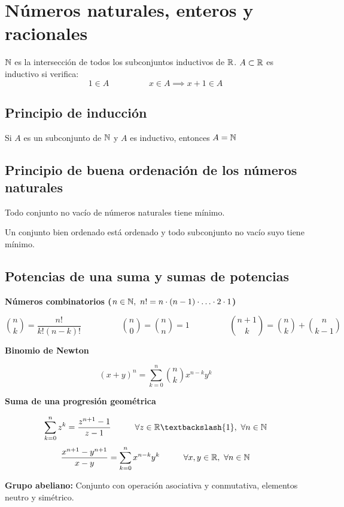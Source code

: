 \section{Números naturales, enteros y racionales}
$\mathbb{N}$ es la intersección de todos los subconjuntos inductivos de $\mathbb{R}$. $A\subset \mathbb{R}$ es inductivo si verifica:
$$ 1\in A \hspace{2cm}
x\in A \implies x+1\in A$$



\subsection{Principio de inducción}
Si $A$ es un subconjunto de $\mathbb{N}$ y $A$ es inductivo, entonces $A=\mathbb{N}$

\subsection{Principio de buena ordenación de los números naturales}
Todo conjunto no vacío de números naturales tiene mínimo.

Un conjunto bien ordenado está ordenado y todo subconjunto no vacío suyo tiene mínimo.

\subsection{Potencias de una suma y sumas de potencias}
\begin{center}
	\textbf{Números combinatorios ($n\in\N, \ n! =n\cdot(n-1)\cdot\hdots\cdot2\cdot 1$)}
\end{center}
$$ \binom{n}{k} = 			
	\frac{n!}{k!(n-k)!}
\hspace{2cm}
   \binom{n}{0} = \binom{n}{n} = 1   
\hspace{2cm} 
 \binom{n+1}{k} = \binom{n}{k} + \binom{n}{k-1} 
$$ 
\begin{center}
	\textbf{Binomio de Newton}
\end{center}
$$(x+y)^n = \sum_{k=0}^{n} \binom{n}{k} x^{n-k}y^k$$

\begin{center}
	\textbf{Suma de una progresión geométrica} 
\end{center}
$$\sum_{k=0}^n z^k= \frac{z^{n+1} - 1}{z-1} \hspace{1cm} \forall z\in\R \textbackslash \{1\}, \  \forall n \in\N$$
$$ \frac{x^{n+1}-y^{n+1}}{x-y} = \sum_{k=0}^n x^{n-k}y^k
 \hspace{1cm} \forall x,y\in\mathbb{R}, \ \forall n\in\mathbb{N} $$
 
\textbf{Grupo abeliano: }
Conjunto con operación asociativa y conmutativa,
 elementos neutro y simétrico.